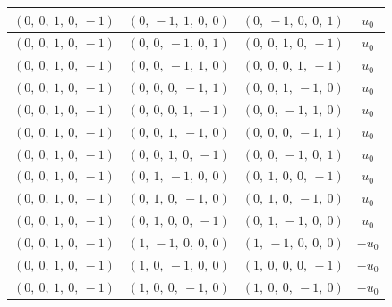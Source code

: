 \documentclass[11pt]{article}
\theoremstyle{definition}
\begin{document}
\begin{longtable}{|l|l|l|c|}
    \hline
    $\left( 0, \  0, \  1, \  0, \  -1\right)$ & $\left( 0, \  -1, \  1, \  0, \  0\right)$ & $\left( 0, \  -1, \  0, \  0, \  1\right)$ & $u_{0}$ \\
    \hline
    $\left( 0, \  0, \  1, \  0, \  -1\right)$ & $\left( 0, \  0, \  -1, \  0, \  1\right)$ & $\left( 0, \  0, \  1, \  0, \  -1\right)$ & $u_{0}$ \\
    \hline
    $\left( 0, \  0, \  1, \  0, \  -1\right)$ & $\left( 0, \  0, \  -1, \  1, \  0\right)$ & $\left( 0, \  0, \  0, \  1, \  -1\right)$ & $u_{0}$ \\
    \hline
    $\left( 0, \  0, \  1, \  0, \  -1\right)$ & $\left( 0, \  0, \  0, \  -1, \  1\right)$ & $\left( 0, \  0, \  1, \  -1, \  0\right)$ & $u_{0}$ \\
    \hline
    $\left( 0, \  0, \  1, \  0, \  -1\right)$ & $\left( 0, \  0, \  0, \  1, \  -1\right)$ & $\left( 0, \  0, \  -1, \  1, \  0\right)$ & $u_{0}$ \\
    \hline
    $\left( 0, \  0, \  1, \  0, \  -1\right)$ & $\left( 0, \  0, \  1, \  -1, \  0\right)$ & $\left( 0, \  0, \  0, \  -1, \  1\right)$ & $u_{0}$ \\
    \hline
    $\left( 0, \  0, \  1, \  0, \  -1\right)$ & $\left( 0, \  0, \  1, \  0, \  -1\right)$ & $\left( 0, \  0, \  -1, \  0, \  1\right)$ & $u_{0}$ \\
    \hline
    $\left( 0, \  0, \  1, \  0, \  -1\right)$ & $\left( 0, \  1, \  -1, \  0, \  0\right)$ & $\left( 0, \  1, \  0, \  0, \  -1\right)$ & $u_{0}$ \\
    \hline
    $\left( 0, \  0, \  1, \  0, \  -1\right)$ & $\left( 0, \  1, \  0, \  -1, \  0\right)$ & $\left( 0, \  1, \  0, \  -1, \  0\right)$ & $u_{0}$ \\
    \hline
    $\left( 0, \  0, \  1, \  0, \  -1\right)$ & $\left( 0, \  1, \  0, \  0, \  -1\right)$ & $\left( 0, \  1, \  -1, \  0, \  0\right)$ & $u_{0}$ \\
    \hline
    $\left( 0, \  0, \  1, \  0, \  -1\right)$ & $\left( 1, \  -1, \  0, \  0, \  0\right)$ & $\left( 1, \  -1, \  0, \  0, \  0\right)$ & $- u_{0}$ \\
    \hline
    $\left( 0, \  0, \  1, \  0, \  -1\right)$ & $\left( 1, \  0, \  -1, \  0, \  0\right)$ & $\left( 1, \  0, \  0, \  0, \  -1\right)$ & $- u_{0}$ \\
    \hline
    $\left( 0, \  0, \  1, \  0, \  -1\right)$ & $\left( 1, \  0, \  0, \  -1, \  0\right)$ & $\left( 1, \  0, \  0, \  -1, \  0\right)$ & $- u_{0}$ \\

\end{longtable}
\end{document}
